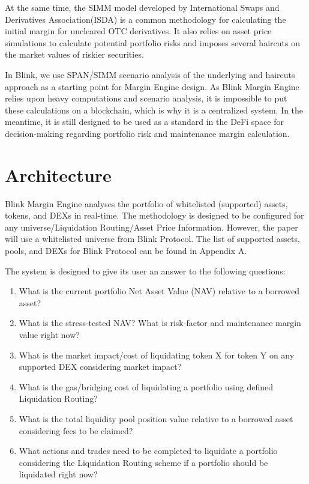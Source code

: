 \documentclass[conference]{IEEEtran}
\begin{document}
At the same time, the SIMM model developed by International Swaps and Derivatives Association(ISDA) is a common methodology for calculating the initial margin for uncleared OTC derivatives. It also relies on asset price simulations to calculate potential portfolio risks and imposes several haircuts on the market values of riskier securities. \cite{simm-whitepaper}

In Blink, we use SPAN/SIMM scenario analysis of the underlying and haircuts approach as a starting point for Margin Engine design. As Blink Margin Engine relies upon heavy computations and scenario analysis, it is impossible to put these calculations on a blockchain, which is why it is a centralized system. In the meantime, it is still designed to be used as a standard in the DeFi space for decision-making regarding portfolio risk and maintenance margin calculation. 

\section {Architecture}

Blink Margin Engine analyses the portfolio of whitelisted (supported) assets, tokens, and DEXs in real-time. 
The methodology is designed to be configured for any universe/Liquidation Routing/Asset Price Information. However, the paper will use a whitelisted universe from Blink Protocol. The list of supported assets, pools, and DEXs for Blink Protocol can be found in Appendix A.

The system is designed to give its user an answer to the following questions:
  \begin{enumerate}
  \item What is the current portfolio Net Asset Value (NAV) relative to a borrowed asset?
  \item What is the stress-tested NAV? What is risk-factor and maintenance margin value right now?
  \item What is the market impact/cost of liquidating token X for token Y on any supported DEX considering market impact?
  \item What is the gas/bridging cost of liquidating a portfolio using defined Liquidation Routing?
  \item What is the total liquidity pool position value relative to a borrowed asset considering fees to be claimed?
  \item What actions and trades need to be completed to liquidate a portfolio considering the Liquidation Routing scheme if a portfolio should be liquidated right now?
  \end{enumerate}
\end{document}
